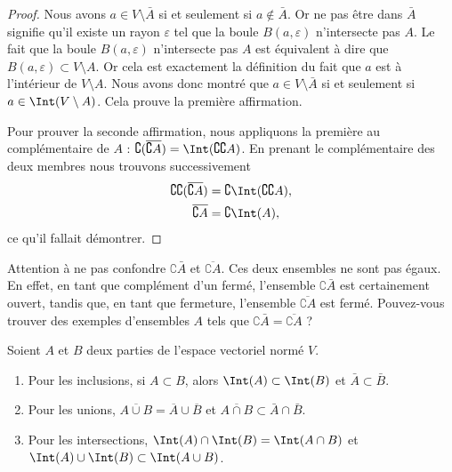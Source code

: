 \begin{proof}
	Nous avons $a\in V\setminus\bar A$ si et seulement si $a\notin\bar A$. Or ne pas être dans $\bar A$ signifie qu'il existe un rayon $\varepsilon$ tel que la boule $B(a,\varepsilon)$ n'intersecte pas $A$. Le fait que la boule $B(a,\varepsilon)$ n'intersecte pas $A$ est équivalent à dire que $B(a,\varepsilon)\subset V\setminus A$. Or cela est exactement la définition du fait que $a$ est à l'intérieur de $V\setminus A$. Nous avons donc montré que $a\in V\setminus \bar A$ si et seulement si $a\in\Int(V\setminus A)$. Cela prouve la première affirmation.

	Pour prouver la seconde affirmation, nous appliquons la première au complémentaire de $A$ : $\complement(\overline{ \complement A })=\Int(\complement\complement A)$. En prenant le complémentaire des deux membres nous trouvons successivement
	\begin{equation}
		\begin{aligned}[]
			\complement\complement(\overline{ \complement A })&=\complement\Int(\complement\complement A),\\
			\overline{ \complement A }&=\complement\Int(A),
		\end{aligned}
	\end{equation}
	ce qu'il fallait démontrer.
\end{proof}

Attention à ne pas confondre $\complement \bar A$ et $\overline{ \complement A }$. Ces deux ensembles ne sont pas égaux. En effet, en tant que complément d'un fermé, l'ensemble $\complement \bar A$ est certainement ouvert, tandis que, en tant que fermeture, l'ensemble $\overline{ \complement A }$ est fermé. Pouvez-vous trouver des exemples d'ensembles $A$ tels que $\complement \bar A=\overline{ \complement A }$ ?

\begin{proposition}
	Soient $A$ et $B$ deux parties de l'espace vectoriel normé $V$.
	\begin{enumerate}
		\item
			Pour les inclusions, si $A\subset B$, alors $\Int(A)\subset\Int(B)$ et $\bar A\subset\bar B$.
		\item
			Pour les unions, $\overline{ A\cup B }=\overline{ A }\cup\overline{ B }$ et $\overline{ A\cap B }\subset\bar A\cap\bar B$.
		\item
			Pour les intersections, $\Int(A)\cap\Int(B)=\Int(A\cap B)$ et $\Int(A)\cup\Int(B)\subset\Int(A\cup B)$.
	\end{enumerate}
\end{proposition}

